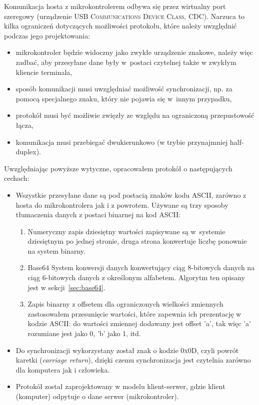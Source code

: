 Komunikacja hosta z mikrokontrolerem odbywa się przez wirtualny port szeregowy (urządzenie \textsc{USB Communications Device Class, CDC}). Narzuca to kilka ograniczeń dotyczących możliwości protokołu, które należy uwzględnić podczas jego projektowania:
\begin{itemize}
 \item mikrokontroler będzie widoczny jako zwykłe urządzenie znakowe, należy więc zadbać, aby przesyłane dane były w~postaci czytelnej także w zwykłym kliencie terminala,
 \item sposób komunikacji musi uwzględniać możliwość synchronizacji, np. za pomocą specjalnego znaku, który nie pojawia się w~innym przypadku,
 \item protokół musi być możliwie zwięzły ze względu na ograniczoną przepustowość łącza,
 \item komunikacja musi przebiegać dwukierunkowo (w trybie przynajmniej half-duplex).\\
\end{itemize}

Uwzględniając powyższe wytyczne, opracowałem protokół o następujących cechach:
\begin{itemize}
 \item Wszystkie przesyłane dane są pod postacią znaków kodu ASCII, zarówno z hosta do mikrokontrolera jak i z powrotem. Używane są trzy sposoby tłumaczenia danych z postaci binarnej na kod ASCII:
 \begin{enumerate}
  \item Numeryczny zapis dziesiętny\label{item:decimal} \pauza wartości zapisywane są w~systemie dziesiętnym po jednej stronie, druga strona konwertuje liczbę ponownie na system binarny.
  \item Base64\label{item:base64} \pauza System konwersji danych konwertujący ciąg 8-bitowych danych na ciąg 6-bitowych danych z określonym alfabetem. Algorytm ten opisany jest w sekcji~\ref{sec:base64}.
  \item Zapis binarny z offsetem\label{item:offset} \pauza dla ograniczonych wielkości zmiennych zastosowałem przesunięcie wartości, które zapewnia ich prezentację w kodzie ASCII: do wartości zmiennej dodawany jest offset 'a', tak więc 'a' rozumiane jest jako 0, 'b' jako 1, itd.
 \end{enumerate}
 \item Do synchronizacji wykorzystany został znak o kodzie \textsc{0x0D}, czyli powrót karetki (\textit{carriage return}), dzięki czemu synchronizacja jest czytelnia zarówno dla komputera jak i człowieka.
 \item Protokół został zaprojektowany w modelu klient-serwer, gdzie klient (komputer) odpytuje o dane serwer (mikrokontroler).\\
\end{itemize}

